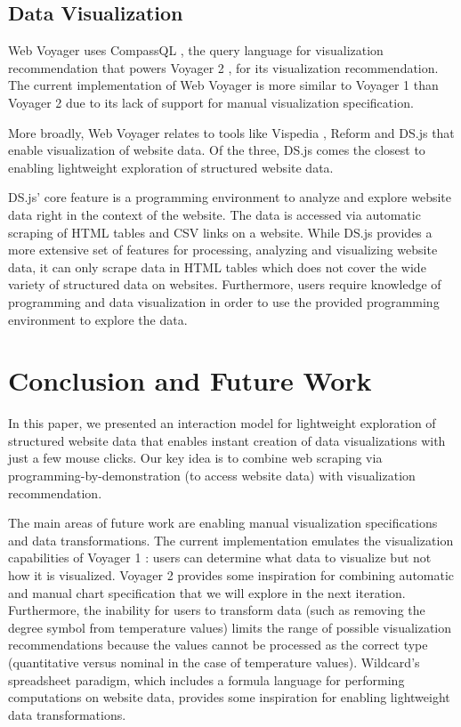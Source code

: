 \documentclass{vgtc}                          %
\begin{document}
\subsection{Data Visualization}

Web Voyager uses CompassQL \cite{wongsuphasawat2016}, the query
language for visualization recommendation that powers Voyager 2
\cite{wongsuphasawat2017}, for its visualization recommendation. The
current implementation of Web Voyager is more similar to Voyager 1 \cite{wongsuphasawat2016a} than
Voyager 2 due to its lack of support for manual visualization
specification.

More broadly, Web Voyager relates to tools like Vispedia
\cite{chan2008}, Reform \cite{toomim2009} and DS.js \cite{zhang2017}
that enable visualization of website data. Of the three, DS.js comes the
closest to enabling lightweight exploration of structured website
data.

DS.js' core feature is a programming environment to analyze and explore
website data right in the context of the website. The data is accessed
via automatic scraping of HTML tables and CSV links on a website. While
DS.js provides a more extensive set of features for processing, analyzing and
visualizing website data, it can only scrape data in HTML tables which
does not cover the wide variety of structured data on websites.
Furthermore, users require knowledge of programming and data visualization in order to use
the provided programming environment to explore the data.

\section{Conclusion and Future Work} \label{conclusion}

In this paper, we presented an interaction model for lightweight exploration
of structured website data that enables instant creation of data visualizations with 
just a few mouse clicks. Our key idea is to combine web scraping via programming-by-demonstration (to access
website data) with visualization recommendation.

The main areas of future work are enabling manual visualization specifications and
data transformations. The current implementation emulates the
visualization capabilities of Voyager 1 \cite{wongsuphasawat2016a}:
users can determine what data to visualize but not how it is visualized. Voyager 2 
\cite{wongsuphasawat2017} provides some inspiration for combining automatic
and manual chart specification that we will explore in the next iteration.
Furthermore, the inability for users to transform data (such as removing
the degree symbol from temperature values) limits the range of possible
visualization recommendations because the values cannot be processed as the
correct type (quantitative versus nominal in the case of temperature values). Wildcard's
\cite{litt2020} spreadsheet paradigm, which includes a formula language for performing
computations on website data, provides some inspiration for enabling lightweight data
transformations.
\end{document}
